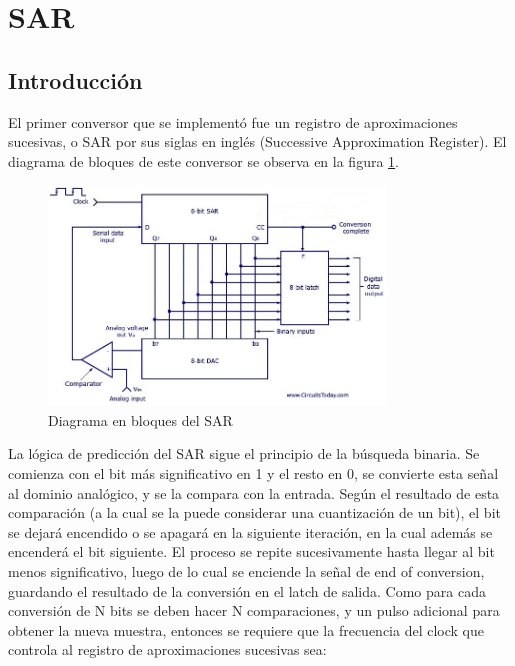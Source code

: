 \documentclass[assd_tp3_main.tex]{subfiles}
\begin{document}
\section{SAR}

\subsection{Introducci\'on}

El primer conversor que se implement\'o fue un registro de aproximaciones sucesivas, o SAR por sus siglas en ingl\'es (Successive Approximation Register). El diagrama de bloques de este conversor se observa en la figura \ref{fig:sar-bloques}.


\begin{figure}[ht!]
	\centering
	\includegraphics[width=0.8\textwidth]{images/ej2/sar-bloques.jpg}
	\caption{Diagrama en bloques del SAR}
	\label{fig:sar-bloques}
\end{figure}

La l\'ogica de predicci\'on del SAR sigue el principio de la b\'usqueda binaria. Se comienza con el bit m\'as significativo en 1 y el resto en 0, se convierte esta se\~nal al dominio anal\'ogico, y se la compara con la entrada. Seg\'un el resultado de esta comparaci\'on (a la cual se la puede considerar una cuantizaci\'on de un bit), el bit se dejar\'a encendido o se apagar\'a en la siguiente iteraci\'on, en la cual adem\'as se encender\'a el bit siguiente. El proceso se repite sucesivamente hasta llegar al bit menos significativo, luego de lo cual se enciende la se\~nal de end of conversion, guardando el resultado de la conversi\'on en el latch de salida. Como para cada conversi\'on de N bits se deben hacer N comparaciones, y un pulso adicional para obtener la nueva muestra,  entonces se requiere que la frecuencia del clock que controla al registro de aproximaciones sucesivas sea:
\end{document}
